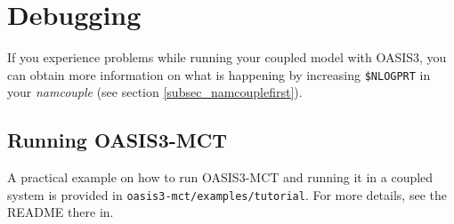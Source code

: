 \section{Debugging}

If you experience problems while running your coupled model with
OASIS3, you can obtain more information on what is happening by increasing {\tt \$NLOGPRT} in your {\it namcouple} (see section \ref{subsec_namcouplefirst}).

\subsection{Running OASIS3-MCT}

A practical example on how to run OASIS3-MCT and running it in a
coupled system is provided in {\tt oasis3-mct/examples/tutorial}. For
more details, see the README there in.

